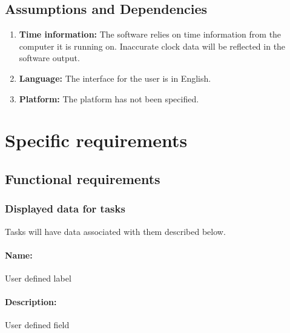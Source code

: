 \documentclass[12pt,a4paper]{article}
\begin{document}

\subsection{Assumptions and Dependencies}
\begin{enumerate}
\item \textbf{Time information:} The software relies on time information from the computer it is running on. Inaccurate clock data will be reflected in the software output. 
\item \textbf{Language:} The interface for the user is in English.
\item \textbf{Platform:} The platform has not been specified.
\end{enumerate}

\section{Specific requirements}

\subsection{Functional requirements}

\subsubsection{Displayed data for tasks}
Tasks will have data associated with them described below. 
\paragraph{Name:} User defined label
\paragraph{Description:} User defined field
\end{document}
